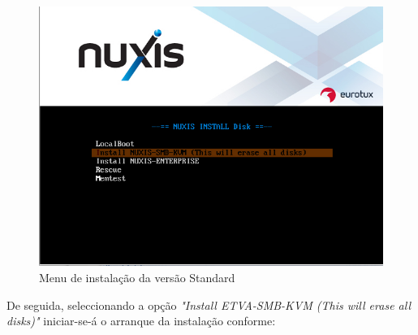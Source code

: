 \begin{figure}[H]
	\begin{center}
	\includegraphics[scale=0.6]{screenshots/install_etva1.png}
	\caption{Menu de instalação da versão Standard}
	\label{fig:boot_install_screen_standard}
	\end{center}
\end{figure}

De seguida, seleccionando a opção \emph{"Install ETVA-SMB-KVM (This will erase all disks)"} iniciar-se-á o arranque da instalação conforme:

